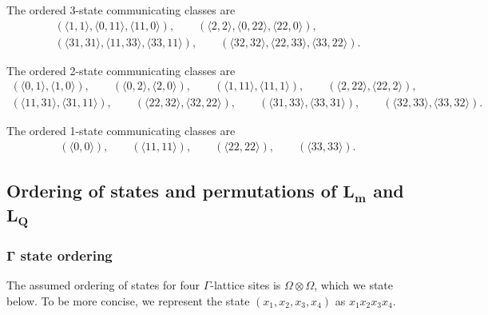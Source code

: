 \documentclass[pdftex]{sigma}
\numberwithin{equation}{section}
\theoremstyle{definition}
\begin{document}
The ordered 3-state communicating classes are
\begin{gather*}
(\langle 1, 1\rangle, \langle0, 11\rangle, \langle11, 0\rangle),\qquad
(\langle 2, 2\rangle, \langle0, 22\rangle, \langle22, 0\rangle),\\
(\langle 31, 31\rangle, \langle11, 33\rangle, \langle33, 11\rangle),\qquad
(\langle 32, 32\rangle, \langle22, 33\rangle, \langle33, 22\rangle).
\end{gather*}

The ordered 2-state communicating classes are
\begin{gather*}
(\langle 0, 1\rangle, \langle1, 0\rangle),\qquad
(\langle 0, 2\rangle, \langle2, 0\rangle),\qquad
(\langle 1, 11\rangle, \langle11, 1\rangle),\qquad
(\langle 2, 22\rangle, \langle22, 2\rangle),\\
(\langle 11, 31\rangle, \langle31, 11\rangle),\qquad
(\langle 22, 32\rangle, \langle32, 22\rangle),\qquad
(\langle 31, 33\rangle, \langle33, 31\rangle),\qquad
(\langle 32, 33\rangle, \langle33, 32\rangle).
\end{gather*}

The ordered 1-state communicating classes are
\begin{gather*}
(\langle 0, 0\rangle),\qquad
(\langle 11, 11\rangle),\qquad
(\langle 22, 22\rangle),\qquad
(\langle 33, 33\rangle).
\end{gather*}

\subsection[Ordering of states and permutations of L\_m and L\_q]{Ordering of states and permutations of $\boldsymbol{L_m}$ and $\boldsymbol{L_Q}$}
\label{PermutationsAppendix}
\subsubsection[Gamma state ordering]{$\boldsymbol{\Gamma}$ state ordering}
The assumed ordering of states for four $\Gamma$-lattice sites is $\Omega \otimes \Omega$, which we state below. To be more concise, we represent the state $(x_1,x_2,x_3,x_4)$ as $x_1x_2x_3x_4$.
\end{document}
